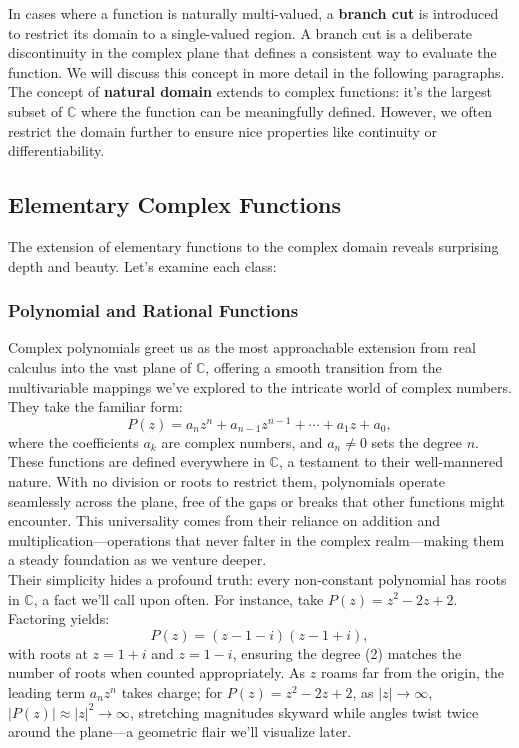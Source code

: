 \noindent In cases where a function is naturally multi-valued, a \textbf{branch cut} is introduced to restrict its domain to a single-valued region. A branch cut is a deliberate discontinuity in the complex plane that defines a consistent way to evaluate the function. We will discuss this concept in more detail in the following paragraphs. \\

\noindent The concept of \textbf{natural domain} extends to complex functions: it's the largest subset of $\mathbb{C}$ where the function can be meaningfully defined. However, we often restrict the domain further to ensure nice properties like continuity or differentiability.


\subsection*{Elementary Complex Functions} 

\noindent The extension of elementary functions to the complex domain reveals surprising depth and beauty. Let's examine each class:

\subsubsection*{Polynomial and Rational Functions}

\noindent Complex polynomials greet us as the most approachable extension from real calculus into the vast plane of $\mathbb{C}$, offering a smooth transition from the multivariable mappings we’ve explored to the intricate world of complex numbers. They take the familiar form:
\[
P(z) = a_n z^n + a_{n-1} z^{n-1} + \cdots + a_1 z + a_0,
\]
where the coefficients $a_k$ are complex numbers, and $a_n \neq 0$ sets the degree $n$. These functions are defined everywhere in $\mathbb{C}$, a testament to their well-mannered nature. With no division or roots to restrict them, polynomials operate seamlessly across the plane, free of the gaps or breaks that other functions might encounter. This universality comes from their reliance on addition and multiplication—operations that never falter in the complex realm—making them a steady foundation as we venture deeper. \\

\noindent Their simplicity hides a profound truth: every non-constant polynomial has roots in $\mathbb{C}$, a fact we’ll call upon often. For instance, take $P(z) = z^2 - 2z + 2$. Factoring yields:
\[
P(z) = (z - 1 - i)(z - 1 + i),
\]
with roots at $z = 1 + i$ and $z = 1 - i$, ensuring the degree (2) matches the number of roots when counted appropriately. As $z$ roams far from the origin, the leading term $a_n z^n$ takes charge; for $P(z) = z^2 - 2z + 2$, as $|z| \to \infty$, $|P(z)| \approx |z|^2 \to \infty$, stretching magnitudes skyward while angles twist twice around the plane—a geometric flair we’ll visualize later. \\

